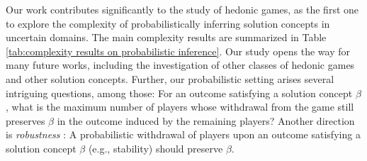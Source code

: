\documentclass[letterpaper]{article} %
\begin{document}
Our work contributes significantly to the study of hedonic games, as the first one to explore the complexity of probabilistically inferring solution concepts in uncertain domains. The main complexity results are summarized in Table \ref{tab:complexity results on probabilistic inference}. Our study opens the way for many future works, including the investigation of other classes of hedonic games and other solution concepts. Further, our probabilistic setting arises several intriguing questions, among those: For an outcome satisfying a solution concept $\beta$, what is the maximum number of players whose withdrawal from the game still preserves $\beta$ in the outcome induced by the remaining players? Another direction is \textit{robustness} \cite{igarashi2019robustness}: A probabilistic withdrawal of players upon an outcome satisfying a solution concept $\beta$ (e.g., stability) should preserve $\beta$. %
\end{document}
